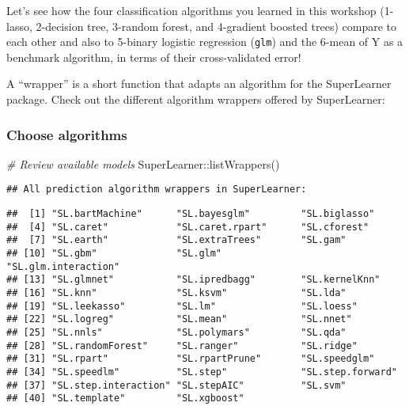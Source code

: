 \documentclass[
]{book}
\newenvironment{Shaded}{\begin{snugshade}}{\end{snugshade}}
\newcommand{\CommentTok}[1]{\textcolor[rgb]{0.56,0.35,0.01}{\textit{#1}}}
\newcommand{\FunctionTok}[1]{\textcolor[rgb]{0.00,0.00,0.00}{#1}}
\newcommand{\NormalTok}[1]{#1}
\newcommand{\SpecialCharTok}[1]{\textcolor[rgb]{0.00,0.00,0.00}{#1}}
\begin{document}
Let's see how the four classification algorithms you learned in this workshop (1-lasso, 2-decision tree, 3-random forest, and 4-gradient boosted trees) compare to each other and also to 5-binary logistic regression (\texttt{glm}) and the 6-mean of Y as a benchmark algorithm, in terms of their cross-validated error!

A ``wrapper'' is a short function that adapts an algorithm for the SuperLearner package. Check out the different algorithm wrappers offered by SuperLearner:

\hypertarget{choose-algorithms}{%
\subsubsection{Choose algorithms}\label{choose-algorithms}}

\begin{Shaded}
\begin{Highlighting}[]
\CommentTok{\# Review available models}
\NormalTok{SuperLearner}\SpecialCharTok{::}\FunctionTok{listWrappers}\NormalTok{()}
\end{Highlighting}
\end{Shaded}

\begin{verbatim}
## All prediction algorithm wrappers in SuperLearner:
\end{verbatim}

\begin{verbatim}
##  [1] "SL.bartMachine"      "SL.bayesglm"         "SL.biglasso"        
##  [4] "SL.caret"            "SL.caret.rpart"      "SL.cforest"         
##  [7] "SL.earth"            "SL.extraTrees"       "SL.gam"             
## [10] "SL.gbm"              "SL.glm"              "SL.glm.interaction" 
## [13] "SL.glmnet"           "SL.ipredbagg"        "SL.kernelKnn"       
## [16] "SL.knn"              "SL.ksvm"             "SL.lda"             
## [19] "SL.leekasso"         "SL.lm"               "SL.loess"           
## [22] "SL.logreg"           "SL.mean"             "SL.nnet"            
## [25] "SL.nnls"             "SL.polymars"         "SL.qda"             
## [28] "SL.randomForest"     "SL.ranger"           "SL.ridge"           
## [31] "SL.rpart"            "SL.rpartPrune"       "SL.speedglm"        
## [34] "SL.speedlm"          "SL.step"             "SL.step.forward"    
## [37] "SL.step.interaction" "SL.stepAIC"          "SL.svm"             
## [40] "SL.template"         "SL.xgboost"
\end{verbatim}
\end{document}

